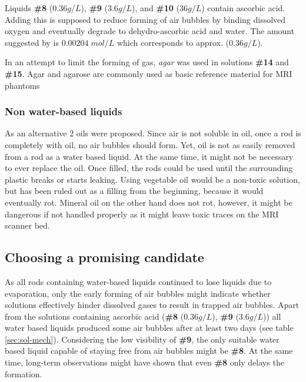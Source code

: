 \vspace{1cm}

Liquids \textbf{\#8} ($0.36 g/L$), \textbf{\#9} ($3.6 g/L$), and \textbf{\#10} ($36 g/L$) contain ascorbic acid.
Adding this is supposed to reduce forming of air bubbles by binding dissolved oxygen and eventually degrade to dehydro-ascorbic acid and water.
The amount suggested by \cite{Abtahi2008, Bodannes1979} is $0.00204 \; mol/L$ which corresponds to approx. ($0.36 g/L$).

\vspace{1cm}

In an attempt to limit the forming of gas, \textit{agar} was used in solutions \textbf{\#14} and \textbf{\#15}.
Agar and agarose are commonly used as basic reference material for MRI phantoms \cite{BuccioliniCiraolo1989, Mathur-DeVre1985}

\subsubsection{Non water-based liquids}
As an alternative 2 oils were proposed.
Since air is not soluble in oil, once a rod is completely with oil, no air bubbles should form.
Yet, oil is not as easily removed from a rod as a water based liquid.
At the same time, it might not be necessary to ever replace the oil.
Once filled, the rods could be used until the surrounding plastic breaks or starts leaking.
Using vegetable oil would be a non-toxic solution, but has been ruled out as a filling from the beginning, because it would eventually rot.
Mineral oil on the other hand does not rot, however, it might be dangerous if not handled properly as it might leave toxic traces on the MRI scanner bed.


\subsection{Choosing a promising candidate}
As all rods containing water-based liquids continued to lose liquids due to evaporation, only the early forming of air bubbles might indicate whether solutions effectively hinder dissolved gases to result in trapped air bubbles.
Apart from the solutions containing ascorbic acid (\textbf{\#8} ($0.36 g/L$), \textbf{\#9} ($3.6 g/L$)) all water based liquids produced some air bubbles after at least two days (see table \ref{sec:sol-mech}).
Considering the low visibility of \textbf{\#9}, the only suitable water based liquid capable of staying free from air bubbles might be \textbf{\#8}.
At the same time, long-term observations might have shown that even \textbf{\#8} only delays the formation.

